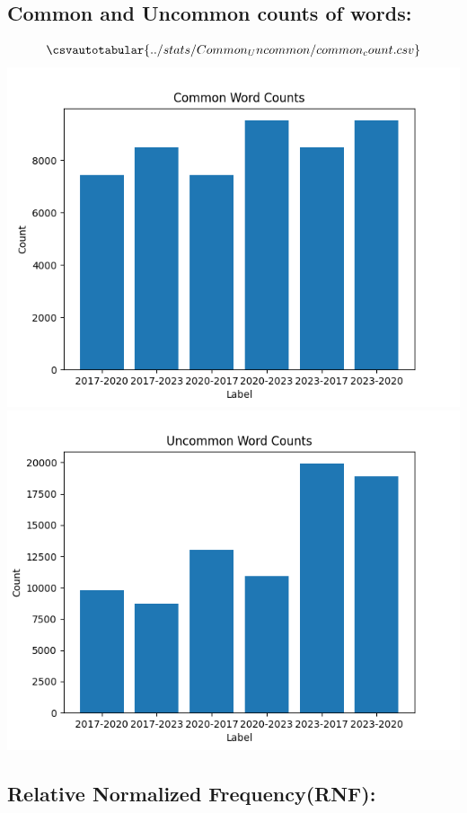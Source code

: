 \documentclass[a4paper]{article}
\begin{document}
\subsection{Common and Uncommon counts of words:}
\begin{align*}
	\csvautotabular{../stats/Common_Uncommon/common_count.csv}
\end{align*} 
\includegraphics[width=1\textwidth]{../stats/Common_Uncommon/commonWords.png}\\
\includegraphics[width=1\textwidth]{../stats/Common_Uncommon/uncommonWords.png}\\
\bigskip

\subsection{Relative Normalized Frequency(RNF):}
\end{document}
